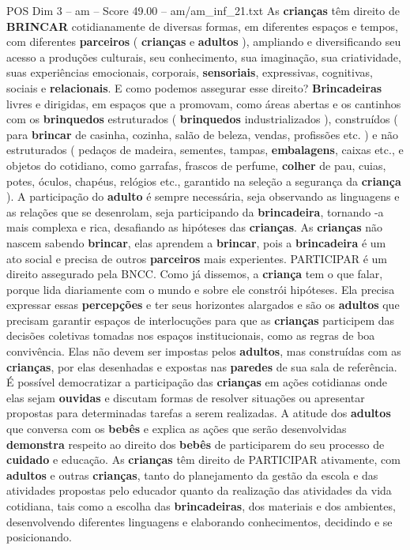 \begin{textsample}{POS Dim 3 – am – Score 49.00 – am/am\_inf\_21.txt}
As \textbf{crianças} têm direito de \textbf{BRINCAR} cotidianamente de diversas formas, em diferentes espaços e tempos, com diferentes \textbf{parceiros} ( \textbf{crianças} e \textbf{adultos} ), ampliando e diversificando seu acesso a produções culturais, seu conhecimento, sua imaginação, sua criatividade, suas experiências emocionais, corporais, \textbf{sensoriais}, expressivas, cognitivas, sociais e \textbf{relacionais}.
E como podemos assegurar esse direito? \textbf{Brincadeiras} livres e dirigidas, em espaços que a promovam, como áreas abertas e os cantinhos com os \textbf{brinquedos} estruturados ( \textbf{brinquedos} industrializados ), construídos ( para \textbf{brincar} de casinha, cozinha, salão de beleza, vendas, profissões etc. ) e não estruturados ( pedaços de madeira, sementes, tampas, \textbf{embalagens}, caixas etc., e objetos do cotidiano, como garrafas, frascos de perfume, \textbf{colher} de pau, cuias, potes, óculos, chapéus, relógios etc., garantido na seleção a segurança da \textbf{criança} ).
A participação do \textbf{adulto} é sempre necessária, seja observando as linguagens e as relações que se desenrolam, seja participando da \textbf{brincadeira}, tornando -a mais complexa e rica, desafiando as hipóteses das \textbf{crianças}.
As \textbf{crianças} não nascem sabendo \textbf{brincar}, elas aprendem a \textbf{brincar}, pois a \textbf{brincadeira} é um ato social e precisa de outros \textbf{parceiros} mais experientes.
PARTICIPAR é um direito assegurado pela BNCC.
Como já dissemos, a \textbf{criança} tem o que falar, porque lida diariamente com o mundo e sobre ele constrói hipóteses.
Ela precisa expressar essas \textbf{percepções} e ter seus horizontes alargados e são os \textbf{adultos} que precisam garantir espaços de interlocuções para que as \textbf{crianças} participem das decisões coletivas tomadas nos espaços institucionais, como as regras de boa convivência.
Elas não devem ser impostas pelos \textbf{adultos}, mas construídas com as \textbf{crianças}, por elas desenhadas e expostas nas \textbf{paredes} de sua sala de referência.
É possível democratizar a participação das \textbf{crianças} em ações cotidianas onde elas sejam \textbf{ouvidas} e discutam formas de resolver situações ou apresentar propostas para determinadas tarefas a serem realizadas.
A atitude dos \textbf{adultos} que conversa com os \textbf{bebês} e explica as ações que serão desenvolvidas \textbf{demonstra} respeito ao direito dos \textbf{bebês} de participarem do seu processo de \textbf{cuidado} e educação.
As \textbf{crianças} têm direito de PARTICIPAR ativamente, com \textbf{adultos} e outras \textbf{crianças}, tanto do planejamento da gestão da escola e das atividades propostas pelo educador quanto da realização das atividades da vida cotidiana, tais como a escolha das \textbf{brincadeiras}, dos materiais e dos ambientes, desenvolvendo diferentes linguagens e elaborando conhecimentos, decidindo e se posicionando.

\end{textsample}
